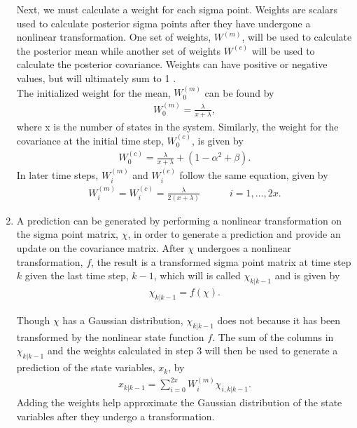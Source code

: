 \begin{enumerate}
        
\noindent Next, we must calculate a weight for each sigma point. Weights are scalars used to calculate posterior sigma points after they have undergone a nonlinear transformation. One set of weights,  $W^{(m)}$, will be used to calculate the posterior mean while another set of weights $W^{(c)}$ will be used to calculate the posterior covariance. Weights can have positive or negative values, but will ultimately sum to 1 \cite{article6}. \\
        
\noindent The initialized weight for the mean, $W^{(m)}_{0} $ can be found by
            \begin{align*}
        W^{(m)}_{0} = \frac{\lambda}{x+ \lambda},
         \end{align*}
         where x is the number of states in the system. Similarly, the weight for the covariance at the initial time step, $W^{(c)}_{0}$, is given by
        \begin{align*}
        W^{(c)}_{0} = \frac{\lambda}{x+ \lambda} + (1 - \alpha^{2} + \beta).
         \end{align*}
          In later time steps, $W^{(m)}_{i} $ and $W^{(c)}_{i}$ follow the same equation, given by
               \begin{align*}
        W^{(m)}_{i} = W^{(c)}_{i} = \frac{\lambda}{2(x + \lambda) } \quad \quad \quad i=1,\dots,2x.
            \end{align*}
           
          
           
        \item A prediction can be generated by performing a nonlinear transformation on the sigma point matrix, $\chi$, in order to generate a prediction and provide an update on the covariance matrix. After $\chi$ undergoes a nonlinear transformation, $f$, the result is a transformed sigma point matrix at time step $k$ given the last time step, $k-1$, which will is called $\chi_{k | k - 1}$ and is given by
        \begin{align*}
        \chi_{k | k - 1} = f(\chi).
        \end{align*}
        
        
        Though $\chi$ has a Gaussian distribution,  $ \chi_{k | k - 1} $ does not because it has been transformed by the nonlinear state function $f$. The sum of the columns in $ \chi_{k | k - 1} $ and the weights calculated in step 3 will then be used to generate a prediction of the state variables, $x_k$, by 
        \begin{align*}
         x_{k|k-1} = \sum^{2x}_{i = 0} W_i^{(m)} \chi_{i, k | k - 1}.
        \end{align*}
       Adding the weights help approximate the Gaussian distribution of the state variables after they undergo a transformation. 
       

\end{enumerate}
